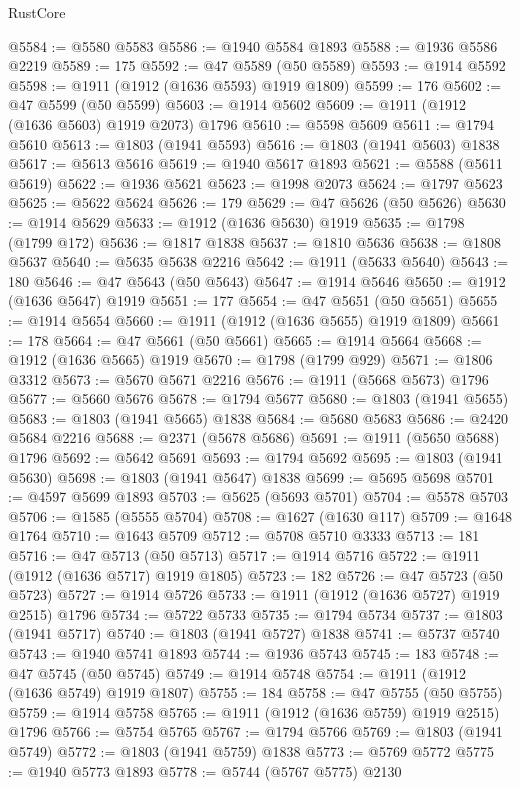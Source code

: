 \begin{lexlean}{RustCore}
\begin{coremodule}
@5584 := @5580 @5583
@5586 := @1940 @5584 @1893
@5588 := @1936 @5586 @2219
@5589 := 175
@5592 := @47 @5589 (@50 @5589)
@5593 := @1914 @5592
@5598 := @1911 (@1912 (@1636 @5593) @1919 @1809)
@5599 := 176
@5602 := @47 @5599 (@50 @5599)
@5603 := @1914 @5602
@5609 := @1911 (@1912 (@1636 @5603) @1919 @2073) @1796
@5610 := @5598 @5609
@5611 := @1794 @5610
@5613 := @1803 (@1941 @5593)
@5616 := @1803 (@1941 @5603) @1838
@5617 := @5613 @5616
@5619 := @1940 @5617 @1893
@5621 := @5588 (@5611 @5619)
@5622 := @1936 @5621
@5623 := @1998 @2073
@5624 := @1797 @5623
@5625 := @5622 @5624
@5626 := 179
@5629 := @47 @5626 (@50 @5626)
@5630 := @1914 @5629
@5633 := @1912 (@1636 @5630) @1919
@5635 := @1798 (@1799 @172)
@5636 := @1817 @1838
@5637 := @1810 @5636
@5638 := @1808 @5637
@5640 := @5635 @5638 @2216
@5642 := @1911 (@5633 @5640)
@5643 := 180
@5646 := @47 @5643 (@50 @5643)
@5647 := @1914 @5646
@5650 := @1912 (@1636 @5647) @1919
@5651 := 177
@5654 := @47 @5651 (@50 @5651)
@5655 := @1914 @5654
@5660 := @1911 (@1912 (@1636 @5655) @1919 @1809)
@5661 := 178
@5664 := @47 @5661 (@50 @5661)
@5665 := @1914 @5664
@5668 := @1912 (@1636 @5665) @1919
@5670 := @1798 (@1799 @929)
@5671 := @1806 @3312
@5673 := @5670 @5671 @2216
@5676 := @1911 (@5668 @5673) @1796
@5677 := @5660 @5676
@5678 := @1794 @5677
@5680 := @1803 (@1941 @5655)
@5683 := @1803 (@1941 @5665) @1838
@5684 := @5680 @5683
@5686 := @2420 @5684 @2216
@5688 := @2371 (@5678 @5686)
@5691 := @1911 (@5650 @5688) @1796
@5692 := @5642 @5691
@5693 := @1794 @5692
@5695 := @1803 (@1941 @5630)
@5698 := @1803 (@1941 @5647) @1838
@5699 := @5695 @5698
@5701 := @4597 @5699 @1893
@5703 := @5625 (@5693 @5701)
@5704 := @5578 @5703
@5706 := @1585 (@5555 @5704)
@5708 := @1627 (@1630 @117)
@5709 := @1648 @1764
@5710 := @1643 @5709
@5712 := @5708 @5710 @3333
@5713 := 181
@5716 := @47 @5713 (@50 @5713)
@5717 := @1914 @5716
@5722 := @1911 (@1912 (@1636 @5717) @1919 @1805)
@5723 := 182
@5726 := @47 @5723 (@50 @5723)
@5727 := @1914 @5726
@5733 := @1911 (@1912 (@1636 @5727) @1919 @2515) @1796
@5734 := @5722 @5733
@5735 := @1794 @5734
@5737 := @1803 (@1941 @5717)
@5740 := @1803 (@1941 @5727) @1838
@5741 := @5737 @5740
@5743 := @1940 @5741 @1893
@5744 := @1936 @5743
@5745 := 183
@5748 := @47 @5745 (@50 @5745)
@5749 := @1914 @5748
@5754 := @1911 (@1912 (@1636 @5749) @1919 @1807)
@5755 := 184
@5758 := @47 @5755 (@50 @5755)
@5759 := @1914 @5758
@5765 := @1911 (@1912 (@1636 @5759) @1919 @2515) @1796
@5766 := @5754 @5765
@5767 := @1794 @5766
@5769 := @1803 (@1941 @5749)
@5772 := @1803 (@1941 @5759) @1838
@5773 := @5769 @5772
@5775 := @1940 @5773 @1893
@5778 := @5744 (@5767 @5775) @2130

\end{coremodule}
\end{lexlean}
